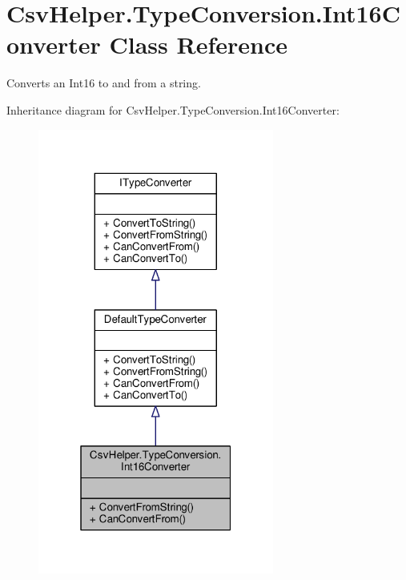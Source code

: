 \hypertarget{a00094}{\section{Csv\-Helper.\-Type\-Conversion.\-Int16\-Converter Class Reference}
\label{a00094}
}


Converts an Int16 to and from a string.  




Inheritance diagram for Csv\-Helper.\-Type\-Conversion.\-Int16\-Converter\-:
\nopagebreak
\begin{figure}[H]
\begin{center}
\leavevmode
\includegraphics[width=220pt]{d0/d29/a00470}
\end{center}
\end{figure}


